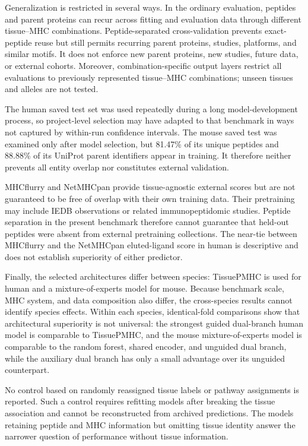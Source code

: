 Generalization is restricted in several ways. In the ordinary evaluation, peptides and parent proteins can recur across fitting and evaluation data through different tissue--MHC combinations. Peptide-separated cross-validation prevents exact-peptide reuse but still permits recurring parent proteins, studies, platforms, and similar motifs. It does not enforce new parent proteins, new studies, future data, or external cohorts. Moreover, combination-specific output layers restrict all evaluations to previously represented tissue--MHC combinations; unseen tissues and alleles are not tested.

The human saved test set was used repeatedly during a long model-development process, so project-level selection may have adapted to that benchmark in ways not captured by within-run confidence intervals. The mouse saved test was examined only after model selection, but 81.47\% of its unique peptides and 88.88\% of its UniProt parent identifiers appear in training. It therefore neither prevents all entity overlap nor constitutes external validation.

MHCflurry and NetMHCpan provide tissue-agnostic external scores but are not guaranteed to be free of overlap with their own training data. Their pretraining may include IEDB observations or related immunopeptidomic studies. Peptide separation in the present benchmark therefore cannot guarantee that held-out peptides were absent from external pretraining collections. The near-tie between MHCflurry and the NetMHCpan eluted-ligand score in human is descriptive and does not establish superiority of either predictor.

Finally, the selected architectures differ between species: TissuePMHC is used for human and a mixture-of-experts model for mouse. Because benchmark scale, MHC system, and data composition also differ, the cross-species results cannot identify species effects. Within each species, identical-fold comparisons show that architectural superiority is not universal: the strongest guided dual-branch human model is comparable to TissuePMHC, and the mouse mixture-of-experts model is comparable to the random forest, shared encoder, and unguided dual branch, while the auxiliary dual branch has only a small advantage over its unguided counterpart.

No control based on randomly reassigned tissue labels or pathway assignments is reported. Such a control requires refitting models after breaking the tissue association and cannot be reconstructed from archived predictions. The models retaining peptide and MHC information but omitting tissue identity answer the narrower question of performance without tissue information.

